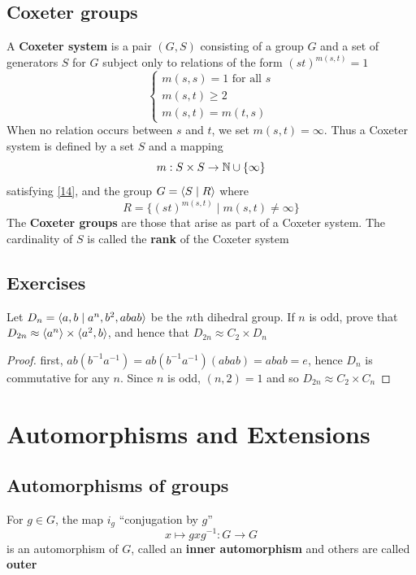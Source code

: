 \documentclass[11pt]{article}
\begin{document}
\subsection{Coxeter groups}
\label{sec:org8d84864}
A \textbf{Coxeter system} is a pair \((G,S)\) consisting of a group \(G\) and a set of generators \(S\)
for \(G\) subject only to relations of the form \((st)^{m(s,t)}=1\)
\begin{equation}
\label{14}
\begin{cases}
m(s,s)=1\text{ for all }s\\
m(s,t)\ge 2\\
m(s,t)=m(t,s)
\end{cases}
\end{equation}
When no relation occurs between \(s\) and \(t\), we set \(m(s,t)=\infty\). Thus a Coxeter system is
defined by a set \(S\) and a mapping
\begin{equation*}
m:S\times S\to\mathbb{N}\cup\{\infty\}
\end{equation*}
satisfying \eqref{14}, and the group \(G=\langle S\mid R\rangle\) where
\begin{equation*}
R=\{(st)^{m(s,t)}\mid m(s,t)\neq\infty\}
\end{equation*}
The \textbf{Coxeter groups} are those that arise as part of a Coxeter system. The cardinality of \(S\) is
called the \textbf{rank} of the Coxeter system

\label{SKIP2}
\subsection{Exercises}
\label{sec:org0279d07}
\begin{exercise}
\label{ex2.1}
Let \(D_n=\langle a,b\mid a^n,b^2,abab\rangle\) be the \(n\)th dihedral group. If \(n\) is odd, prove
that \(D_{2n}\approx\langle a^n\rangle\times\langle a^2,b\rangle\), and hence that \(D_{2n}\approx C_2\times D_n\)
\end{exercise}

\begin{proof}
first, \(ab(b^{-1}a^{-1})=ab(b^{-1}a^{-1})(abab)=abab=e\), hence \(D_n\) is commutative for
any \(n\). Since \(n\) is odd, \((n,2)=1\) and so \(D_{2n}\approx C_2\times C_{n}\)
\end{proof}
\section{Automorphisms and Extensions}
\label{sec:orgdff70b4}
\subsection{Automorphisms of groups}
\label{sec:org1acc0bc}
For \(g\in G\), the map \(i_g\) ``conjugation by \(g\)''
\begin{equation*}
x\mapsto gxg^{-1}:G\to G
\end{equation*}
is an automorphism of \(G\), called an \textbf{inner automorphism} and others are called \textbf{outer}
\end{document}
